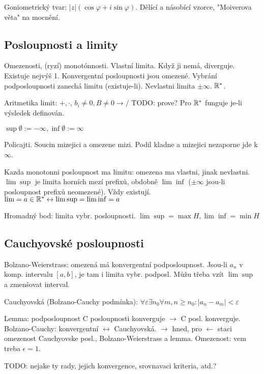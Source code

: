 Goniometrický tvar: $|z|(\cos\varphi+i\sin\varphi)$. Dělící a násobící vzorce,
"Moiverova věta" na mocnění.

\subsection{Posloupnosti a limity}
Omezenosti, (ryzí) monotónnosti.
Vlastní limita. Když ji nemá, diverguje. Existuje nejvýš 1.
Konvergentní posloupnosti jsou omezené.
Vybrání podposloupnosti zanechá limitu (existuje-li).
Nevlastni limita $\pm\infty$. $\mathbb{R}^*$.

Aritmetika limit: $+,\cdot$, $b_i\neq 0,B\neq 0\rightarrow/$
TODO: prove?
Pro $\mathbb{R}^*$ funguje je-li výsledek definován.

$\sup\emptyset:=-\infty,\inf\emptyset:=\infty$

Policajti. Soucin mizejici a omezene mizi.
Podil kladne a mizejici nezaporne jde k $\infty$.

Kazda monotonni posloupnost ma limitu: omezena ma vlastni, jinak nevlastni.
$\lim\sup$ je limita horních mezí prefixů, obdobně $\lim\inf$ ($\pm\infty$
jsou-li posloupnost prefixů neomezené). Vždy existují.
$\lim=a\in\mathbb{R}^*\leftrightarrow\lim\sup=\lim\inf=a$

Hromadný bod: limita vybr. posloupnosti. $\lim\sup=\max H,\lim\inf=\min H$

\subsection{Cauchyovské posloupnosti}
Bolzano-Weierstrass: omezená má konvergentní podposloupnost.
Jsou-li $a_n$ v komp. intervalu $[a,b]$, je tam i limita vybr. podposl.
Můžu třeba vzít $\lim\sup$ a zmenšovat interval.

Cauchyovská (Bolzano-Cauchy podmínka):
$\forall\varepsilon\exists n_0\forall m,n\geq n_0: |a_n-a_m|<\varepsilon$

Lemma: podposloupnost C posloupnosti konverguje $\rightarrow$ C posl.
konverguje.
Bolzano-Cauchy: konvergentní $\leftrightarrow$ Cauchyovská. $\rightarrow$
hned, pro $\leftarrow$ staci omezenost Cauchyovske posl., Bolzano-Weierstrass
a lemma. Omezenost: vem treba $\epsilon=1$.

TODO: nejake ty rady, jejich konvergence, srovnavaci kriteria, atd.?
